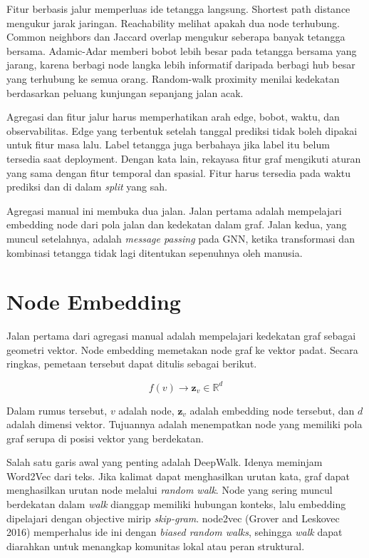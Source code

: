 Fitur berbasis jalur memperluas ide tetangga langsung. Shortest path distance mengukur jarak jaringan. Reachability melihat apakah dua node terhubung. Common neighbors dan Jaccard overlap mengukur seberapa banyak tetangga bersama. Adamic-Adar memberi bobot lebih besar pada tetangga bersama yang jarang, karena berbagi node langka lebih informatif daripada berbagi hub besar yang terhubung ke semua orang. Random-walk proximity menilai kedekatan berdasarkan peluang kunjungan sepanjang jalan acak.

Agregasi dan fitur jalur harus memperhatikan arah edge, bobot, waktu, dan observabilitas. Edge yang terbentuk setelah tanggal prediksi tidak boleh dipakai untuk fitur masa lalu. Label tetangga juga berbahaya jika label itu belum tersedia saat deployment. Dengan kata lain, rekayasa fitur graf mengikuti aturan yang sama dengan fitur temporal dan spasial. Fitur harus tersedia pada waktu prediksi dan di dalam \emph{split} yang sah.

Agregasi manual ini membuka dua jalan. Jalan pertama adalah mempelajari embedding node dari pola jalan dan kedekatan dalam graf. Jalan kedua, yang muncul setelahnya, adalah \emph{message passing} pada GNN, ketika transformasi dan kombinasi tetangga tidak lagi ditentukan sepenuhnya oleh manusia.

\section{Node Embedding}\label{node-embedding}

Jalan pertama dari agregasi manual adalah mempelajari kedekatan graf sebagai geometri vektor. Node embedding memetakan node graf ke vektor padat. Secara ringkas, pemetaan tersebut dapat ditulis sebagai berikut.

\[
f(v) \to \mathbf{z}_v \in \mathbb{R}^d
\]

Dalam rumus tersebut, \(v\) adalah node, \(\mathbf{z}_v\) adalah embedding node tersebut, dan \(d\) adalah dimensi vektor. Tujuannya adalah menempatkan node yang memiliki pola graf serupa di posisi vektor yang berdekatan.

Salah satu garis awal yang penting adalah DeepWalk. Idenya meminjam Word2Vec dari teks. Jika kalimat dapat menghasilkan urutan kata, graf dapat menghasilkan urutan node melalui \emph{random walk}. Node yang sering muncul berdekatan dalam \emph{walk} dianggap memiliki hubungan konteks, lalu embedding dipelajari dengan objective mirip \emph{skip-gram}. node2vec (Grover and Leskovec 2016) memperhalus ide ini dengan \emph{biased random walks}, sehingga \emph{walk} dapat diarahkan untuk menangkap komunitas lokal atau peran struktural.

